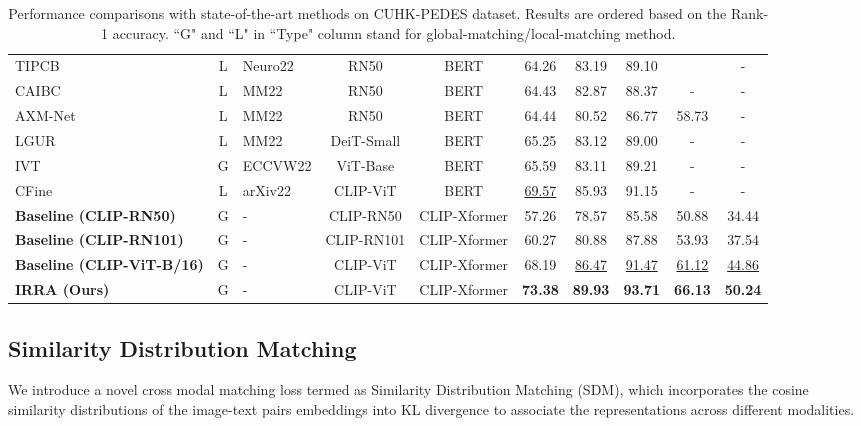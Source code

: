 \documentclass[10pt,twocolumn,letterpaper]{article}
\begin{document}
\begin{table*}[ht]
{\begin{tabular}{l|clcc|ccccc}
  TIPCB\cite{chen2022tipcb}             &L    &Neuro22 &RN50      &BERT          &64.26             &83.19          &89.10          &               &-              \\
  CAIBC\cite{wang2022caibc}             &L    &MM22    &RN50      &BERT          &64.43             &82.87          &88.37          &-              &-              \\
  AXM-Net\cite{farooq2022axm}           &L    &MM22    &RN50      &BERT          &64.44             &80.52          &86.77          &58.73          &-              \\
  LGUR\cite{shao2022learning}           &L    &MM22    &DeiT-Small&BERT          &65.25             &83.12          &89.00          &-              &-              \\
  IVT\cite{shu2022see}                  &G    &ECCVW22 &ViT-Base  &BERT          &65.59             &83.11          &89.21          &-              &-              \\
  CFine\cite{yan2022clip}               &L    &arXiv22 &CLIP-ViT  &BERT          &\underline{69.57} &85.93          &91.15          &-              &-              \\
  \hline
  \textbf{Baseline (CLIP-RN50)}         &G    &-       &CLIP-RN50 &CLIP-Xformer  &57.26             &78.57          &85.58          &50.88          &34.44          \\
  \textbf{Baseline (CLIP-RN101)}         &G    &-       &CLIP-RN101&CLIP-Xformer  &60.27             &80.88          &87.88          &53.93          &37.54          \\
  \textbf{Baseline (CLIP-ViT-B/16)}     &G    &-       &CLIP-ViT  &CLIP-Xformer  &68.19  &\underline{86.47} &\underline{91.47} &\underline{61.12} &\underline{44.86}\\
  \textbf{IRRA (Ours)}                 &G    &-       &CLIP-ViT  &CLIP-Xformer  &\textbf{73.38} &\textbf{89.93} &\textbf{93.71} &\textbf{66.13} &\textbf{50.24}    \\
\bottomrule
  \end{tabular}}\caption{Performance comparisons with state-of-the-art methods on CUHK-PEDES dataset. Results are ordered based on the Rank-1 accuracy. ``G" and ``L" in ``Type" column stand for global-matching/local-matching method.}
  \label{tab:1}
  \vspace{-4mm}
  \end{table*}

\subsection{Similarity Distribution Matching}
We introduce a novel cross modal matching loss termed as Similarity Distribution Matching (SDM), which incorporates the cosine similarity distributions of the  image-text pairs embeddings into KL divergence to associate the representations across different modalities. 
\end{document}
